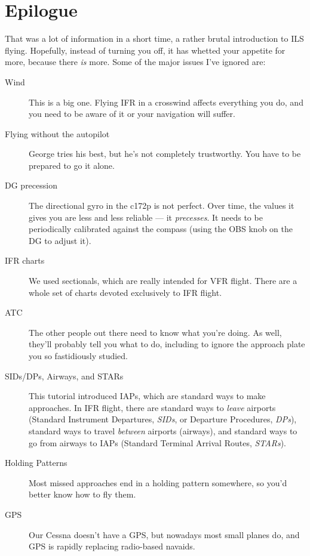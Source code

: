 
\section{Epilogue}


That was a lot of information in a short time, a rather brutal
introduction to ILS flying.  Hopefully, instead of turning you off, it
has whetted your appetite for more, because there \emph{is} more.
Some of the major issues I've ignored are:

\begin{description}
\item[Wind] This is a big one.  Flying IFR in a crosswind affects
  everything you do, and you need to be aware of it or your navigation
  will suffer.
\item[Flying without the autopilot] George tries his best, but he's
  not completely trustworthy.  You have to be prepared to go it
  alone.
\item[DG precession] The directional gyro in the c172p is not perfect.
  Over time, the values it gives you are less and less reliable --- it
  \emph{precesses}.  It needs to be periodically calibrated against
  the compass (using the OBS knob on the DG to adjust it).
\item[IFR charts] We used sectionals, which are really intended for
  VFR flight.  There are a whole set of charts devoted exclusively to
  IFR flight.
\item[ATC] The other people out there need to know what you're doing.
  As well, they'll probably tell you what to do, including to ignore
  the approach plate you so fastidiously studied.
\item[SIDs/DPs, Airways, and STARs] This tutorial introduced IAPs,
  which are standard ways to make approaches.  In IFR flight, there
  are standard ways to \emph{leave} airports (Standard Instrument
  Departures, \emph{SIDs}, or Departure Procedures, \emph{DPs}),
  standard ways to travel \emph{between} airports (airways), and
  standard ways to go from airways to IAPs (Standard Terminal Arrival
  Routes, \emph{STARs}).
\item[Holding Patterns] Most missed approaches end in a holding
  pattern somewhere, so you'd better know how to fly them.
\item[GPS] Our Cessna doesn't have a GPS, but nowadays most small
  planes do, and GPS is rapidly replacing radio-based navaids.
\end{description}


